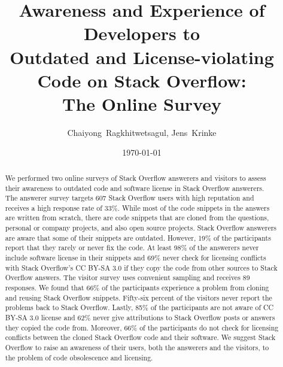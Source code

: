 \documentclass{svjour3}                     %
\begin{document}
\title{Awareness and Experience of Developers to\\ Outdated and License-violating Code on Stack Overflow:\\ The Online Survey}


\author{Chaiyong~Ragkhitwetsagul, Jens~Krinke}


\institute{Chaiyong Ragkhitwetsagul~(\Letter), Jens Krinke \at
              Computer Science Department., University College London, UK \\
              Tel.: +44 (0)20 7679,  Fax: +44 (0)20 7387 1397\\
              \email{\{ucabagk, j.krinke\}@ucl.ac.uk}           %
}

\date{\today}


\maketitle

\begin{abstract}
We performed two online surveys of Stack Overflow answerers and visitors to
assess their awareness to outdated code and software license in Stack Overflow
answerers. The answerer survey targets 607 Stack Overflow users with high
reputation and receives a high response rate of 33\%. While most of the code
snippets in the answers are written from scratch, there are code snippets that
are cloned from the questions, personal or company projects, and also open
source projects. Stack Overflow answerers are aware that some of their snippets
are outdated. However, 19\% of the participants report that they rarely or never
fix the code. At least 98\% of the answerers never include software license in
their snippets and 69\% never check for licensing conflicts with Stack
Overflow's CC BY-SA 3.0 if they copy the code from other sources to Stack
Overflow answers. The visitor survey uses convenient sampling and receives 89
responses. We found that 66\% of the participants experience a problem from
cloning and reusing Stack Overflow snippets. Fifty-six percent of the visitors
never report the problems back to Stack Overflow. Lastly, 85\% of the
participants are not aware of CC BY-SA 3.0 license and 62\% never give
attributions to Stack Overflow posts or answers they copied the code from.
Moreover, 66\% of the participants do not check for licensing conflicts between
the cloned Stack Overflow code and their software. We suggest Stack Overflow to
raise an awareness of their users, both the answerers and the visitors, to the
problem of code obsolescence and licensing.
\end{abstract}
\end{document}
